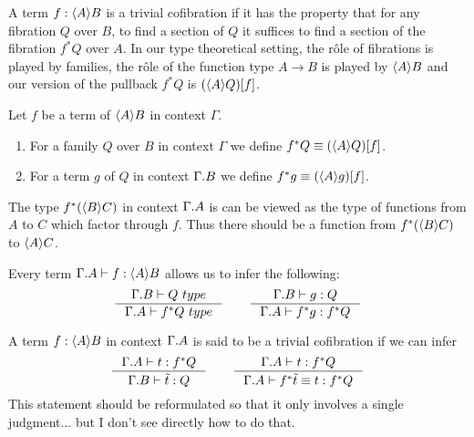 A term $f:\ctxwk{A}{B}$ is a trivial cofibration if it has the
property that for any fibration $Q$ over $B$,
to find a section of $Q$ it suffices to find a section of the fibration
$f^\ast Q$ over $A$. In our type theoretical setting, the rôle of fibrations
is played by families, the rôle of the function type $A\to B$ is played by
$\ctxwk{A}{B}$ and our version of the pullback $f^\ast Q$ is $\subst{f}{\ctxwk{A}{Q}}$.

\begin{defn}
Let $f$ be a term of $\ctxwk{A}{B}$ in context $\Gamma$.
\begin{enumerate}
\item For a family $Q$ over $B$ in context $\Gamma$ we define $f^\ast Q\jdeq\subst{f}{\ctxwk{A}{Q}}$.
\item For a term $g$ of $Q$ in context $\ctxext{\Gamma}{B}$ we define $f^\ast g\jdeq\subst{f}{\ctxwk{A}{g}}$.
\end{enumerate} 
\end{defn}
\begin{rmk}
The type $f^\ast(\ctxwk{B}{C})$ in context $\ctxext{\Gamma}{A}$ is can be viewed as the
type of functions from $A$ to $C$ which factor through $f$. Thus there should be
a function from $f^\ast(\ctxwk{B}{C})$ to $\ctxwk{A}{C}$.
\end{rmk}

\begin{rmk}
Every term $\jtermt{\ctxext{\Gamma}{A}}{\ctxwk{A}{B}}{f}$ allows us to infer the following:
\begin{equation*}
\inference{\jtype{\ctxext{\Gamma}{B}}{Q}}{\jtype{\ctxext{\Gamma}{A}}{f^\ast Q}}
\qquad
\inference{\jtermt{\ctxext{\Gamma}{B}}{Q}{g}}{\jtermt{\ctxext{\Gamma}{A}}{f^\ast Q}{f^\ast g}}
\end{equation*}
\end{rmk}


\begin{defn}
A term $f:\ctxwk{A}{B}$ in context $\ctxext{\Gamma}{A}$ is said to be a trivial
cofibration if we can infer
\begin{equation*}
\inference{\jtermt{\ctxext{\Gamma}{A}}{f^\ast Q}{t}}{\jtermt{\ctxext{\Gamma}{B}}{Q}{\tilde{t}}}\qquad
\inference{\jtermt{\ctxext{\Gamma}{A}}{f^\ast Q}{t}}{\jtermteq{\ctxext{\Gamma}{A}}{f^\ast Q}{f^\ast \tilde{t}}{t}}
\end{equation*}
{\color{red}This statement should be reformulated so that it only involves a single judgment...
but I don't see directly how to do that.}
\end{defn}

